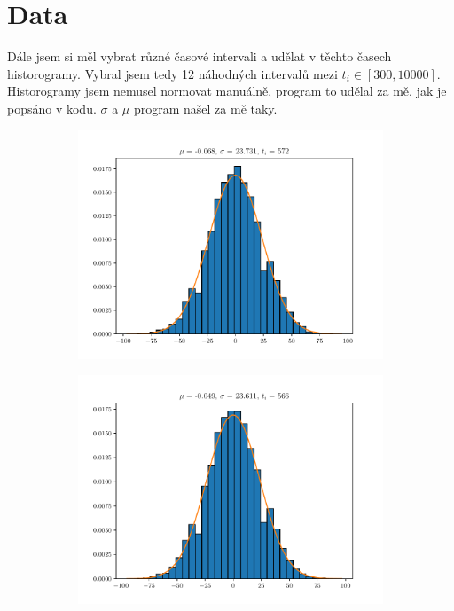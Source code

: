 \documentclass{article}
\begin{document}
\newpage
\section{Data}
Dále jsem si měl vybrat různé časové intervali a udělat v těchto časech historogramy.
Vybral jsem tedy 12 náhodných intervalů mezi $t_{i} \in [300, 10000]$.\\
Historogramy jsem nemusel normovat manuálně, program to udělal za mě, jak je popsáno v kodu.
$\sigma$ a $\mu$ program našel za mě taky.

\begin{figure}
\begin{subfigure}{.3\textwidth}
  \centering
  \includegraphics[width=1.1\linewidth]{hist1.pdf}
\end{subfigure}
\begin{subfigure}{.3\textwidth}
  \centering
  \includegraphics[width=1.1\linewidth]{hist2.pdf}

\end{subfigure}
\end{figure}
\end{document}
